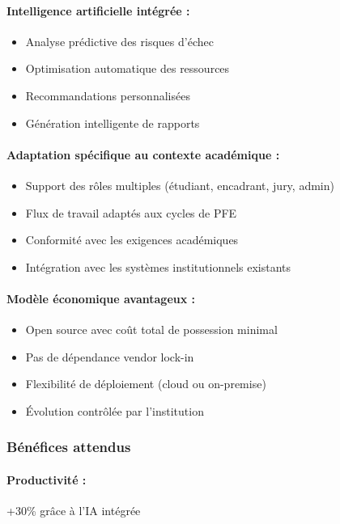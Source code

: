 \paragraph{Intelligence artificielle intégrée :}
\begin{itemize}
    \item Analyse prédictive des risques d'échec
    \item Optimisation automatique des ressources
    \item Recommandations personnalisées
    \item Génération intelligente de rapports
\end{itemize}

\paragraph{Adaptation spécifique au contexte académique :}
\begin{itemize}
    \item Support des rôles multiples (étudiant, encadrant, jury, admin)
    \item Flux de travail adaptés aux cycles de PFE
    \item Conformité avec les exigences académiques
    \item Intégration avec les systèmes institutionnels existants
\end{itemize}

\paragraph{Modèle économique avantageux :}
\begin{itemize}
    \item Open source avec coût total de possession minimal
    \item Pas de dépendance vendor lock-in
    \item Flexibilité de déploiement (cloud ou on-premise)
    \item Évolution contrôlée par l'institution
\end{itemize}

\subsubsection{Bénéfices attendus}

\paragraph{Productivité :} +30\% grâce à l'IA intégrée

